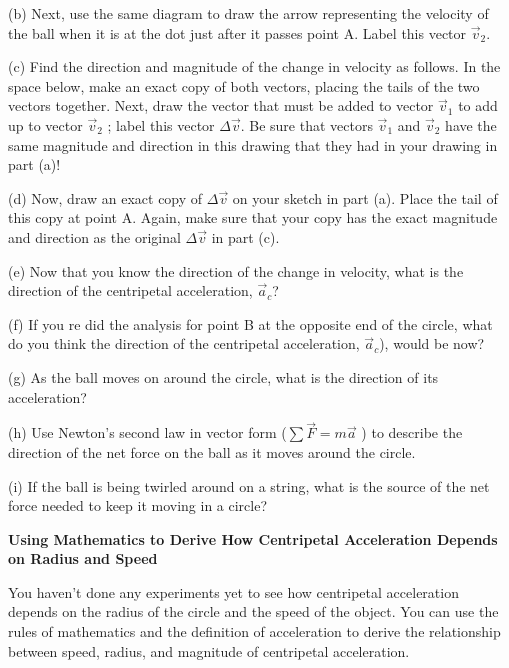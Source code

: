 (b) Next, use the same diagram to draw the arrow representing the velocity of
the ball when it is at the dot just after it passes point A. Label this vector
\(\vec{v} _{2} \).

(c) Find the direction and magnitude of the change in velocity as follows. In
the space below, make an exact copy of both vectors, placing the tails of the
two vectors together. Next, draw the vector that must be added to vector \(\vec{v}_{1} \)
to add up to vector \(\vec{v}_{2} \) ; label this vector \( \Delta  \vec {v}\).
Be sure that vectors \(\vec{v}_{1} \) and \(\vec{v}_{2} \) have the
same magnitude and direction in this drawing that they had in your drawing in
part (a)!
\vspace{30mm}

(d) Now, draw an exact copy of \( \Delta  \vec {v}\) on your sketch in part
(a). Place the tail of this copy at point A. Again, make sure that your copy
has the exact magnitude and direction as the original \( \Delta  \vec {v}\)
in part (c).
\vspace{30mm}

(e) Now that you know the direction of the change in velocity, what is the direction
of the centripetal acceleration, \(\vec{a} _{c} \)?
\vspace{20mm}

(f) If you re did the analysis for point B at the opposite end of the circle,
what do you think the direction of the centripetal acceleration, \(\vec{a} _{c} \)),
would be now?
\vspace{20mm}

(g) As the ball moves on around the circle, what is the direction of its acceleration?
\vspace{20mm}

(h) Use Newton's second law in vector form (\( \sum {\vec F} = m{\vec a}\)
) to describe the direction of the net force on the ball as it moves around
the circle.
\vspace{20mm}

(i) If the ball is being twirled around on a string, what is the source of the
net force needed to keep it moving in a circle?
\answerspace{20mm}

\pagebreak[20]
\textbf{Using Mathematics to Derive How Centripetal Acceleration Depends on
Radius and Speed }

You haven't done any experiments yet to see how centripetal acceleration depends
on the radius of the circle and the speed of the object. You can use the rules
of mathematics and the definition of acceleration to derive the relationship
between speed, radius, and magnitude of centripetal acceleration. 

